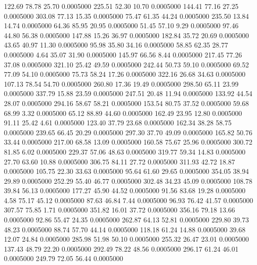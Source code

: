  122.69   78.78   25.70   0.0005000
 225.51   52.30   10.70   0.0005000
 144.41   77.16   27.25   0.0005000
 303.08   77.13   15.35   0.0005000
  75.47   61.35   44.24   0.0005000
 235.50   13.84   14.74   0.0005000
  64.36   85.95   20.95   0.0005000
  51.45   57.10    9.29   0.0005000
  97.46   44.80   56.38   0.0005000
 147.88   15.26   36.97   0.0005000
 182.84   35.72   20.69   0.0005000
  43.65   40.97   11.30   0.0005000
  95.98   35.80   34.16   0.0005000
  58.85   62.35   28.77   0.0005000
   4.64   35.07   31.90   0.0005000
 145.97   66.56    8.44   0.0005000
 217.45   77.26   37.08   0.0005000
 321.10   25.42   49.59   0.0005000
 242.44   50.73   59.10   0.0005000
  69.52   77.09   54.10   0.0005000
  75.73   58.24   17.26   0.0005000
 322.16   26.68   34.63   0.0005000
 107.13   78.54   54.70   0.0005000
 260.80   17.36   19.49   0.0005000
 298.50   65.11   23.99   0.0005000
 337.79   15.88   23.59   0.0005000
 247.51   20.48   11.94   0.0005000
 133.92   44.54   28.07   0.0005000
 294.16   58.67   58.21   0.0005000
 153.54   80.75   37.52   0.0005000
  59.68   68.99    3.32   0.0005000
  65.12   88.89   44.60   0.0005000
 162.49   23.95   12.80   0.0005000
  91.11   25.42    4.61   0.0005000
 123.40   37.79   23.68   0.0005000
 162.34   38.28   58.75   0.0005000
 239.65   66.45   20.29   0.0005000
 297.30   37.70   49.09   0.0005000
 165.82   50.76   33.44   0.0005000
 217.00   68.58   13.09   0.0005000
 160.58   75.67   25.96   0.0005000
 300.72   81.85    6.02   0.0005000
 229.37   57.06   48.63   0.0005000
 319.77   59.34   14.83   0.0005000
  27.70   63.60   10.88   0.0005000
 306.75   84.11   27.72   0.0005000
 311.93   42.72   18.87   0.0005000
 105.75   22.30   33.63   0.0005000
  95.64   61.60   29.65   0.0005000
 354.05   38.94   29.89   0.0005000
 252.29   55.40   46.77   0.0005000
 302.48   34.23   45.09   0.0005000
 108.78   39.84   56.13   0.0005000
 177.27   45.90   44.52   0.0005000
  91.56   83.68   19.28   0.0005000
   4.58   75.17   45.12   0.0005000
  87.63   46.84    7.44   0.0005000
  96.93   76.42   41.57   0.0005000
 307.57   75.85    1.71   0.0005000
 351.82   16.01   37.72   0.0005000
 356.16   79.18   13.66   0.0005000
  92.86   55.47   24.35   0.0005000
 262.87   64.13   52.81   0.0005000
 229.80   39.73   48.23   0.0005000
  88.74   57.70   44.14   0.0005000
 118.18   61.24   14.88   0.0005000
  39.68   12.07   24.84   0.0005000
 285.98   51.98   50.10   0.0005000
 255.32   26.47   23.01   0.0005000
 137.43   48.79   22.20   0.0005000
 292.49   78.22   48.56   0.0005000
 296.17   61.24   46.01   0.0005000
 249.79   72.05   56.44   0.0005000
